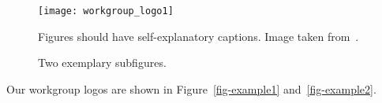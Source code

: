 \begin{figure}
    \centering
    \texttt{[image: workgroup\_logo1]}
    \caption{Figures should have self-explanatory captions.
        Image taken from~\cite{tug-website}.}
    \label{fig:example1}
\end{figure}

\begin{figure}
    \centering
    \hspace{1cm}
    \caption{Two exemplary subfigures.}
    \label{fig:example2}
\end{figure}

Our workgroup logos are shown in Figure~\ref{fig-example1}
and~\ref{fig-example2}.

